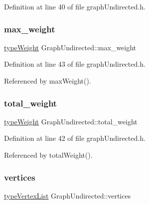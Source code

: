 Definition at line 40 of file graph\+Undirected.\+h.

\mbox{\label{classGraphUndirected_a192e23963095ecfe1b327ba188a26bee}} 
\subsubsection{\texorpdfstring{max\+\_\+weight}{max\_weight}}
{\footnotesize\ttfamily \hyperlink{edge_8h_a2e7ea3be891ac8b52f749ec73fee6dd2}{type\+Weight} Graph\+Undirected\+::max\+\_\+weight\hspace{0.3cm}{\ttfamily [private]}}



Definition at line 43 of file graph\+Undirected.\+h.



Referenced by max\+Weight().

\mbox{\label{classGraphUndirected_a713f460aba5e5ee4d3079f5df25fe14d}} 
\subsubsection{\texorpdfstring{total\+\_\+weight}{total\_weight}}
{\footnotesize\ttfamily \hyperlink{edge_8h_a2e7ea3be891ac8b52f749ec73fee6dd2}{type\+Weight} Graph\+Undirected\+::total\+\_\+weight\hspace{0.3cm}{\ttfamily [private]}}



Definition at line 42 of file graph\+Undirected.\+h.



Referenced by total\+Weight().

\mbox{\label{classGraphUndirected_a2b3210c4f2c00e9db131eb051c23f2e0}} 
\subsubsection{\texorpdfstring{vertices}{vertices}}
{\footnotesize\ttfamily \hyperlink{graphInterface_8h_a21d54d8a139def524d3b0d6f71ec4974}{type\+Vertex\+List} Graph\+Undirected\+::vertices\hspace{0.3cm}{\ttfamily [private]}}



